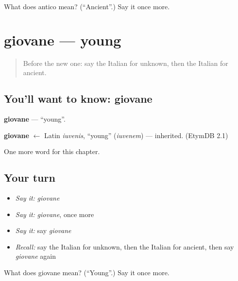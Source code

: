 \begin{tcolorbox}[breakable,colback=teal!4,colframe=teal!35!black,title={Before you move on}]
What does antico mean? (\textquotedblleft{}Ancient\textquotedblright{}.) Say it once more.
\end{tcolorbox}
\section[giovane]{giovane — young}

\label{lesson:IT-C246-giovane}



\begin{quote}
Before the new one: say the Italian for unknown, then the Italian for ancient.
\end{quote}

\subsection*{You'll want to know: giovane}
\textbf{giovane} — \textquotedblleft{}young\textquotedblright{}.

\begin{cousinweb}
\textbf{giovane} $\leftarrow$ Latin \emph{iuvenis}, \textquotedblleft{}young\textquotedblright{} (\emph{iuvenem}) — inherited. (EtymDB 2.1)
\end{cousinweb}

\begin{grammarlens}[title={What you've built}]
One more word for this chapter.
\end{grammarlens}

\subsection*{Your turn}
\begin{itemize}
\raggedright
  \item \emph{Say it:} \emph{giovane}
  \item \emph{Say it:} \emph{giovane}, once more
  \item \emph{Say it:} say \emph{giovane}
  \item \emph{Recall:} say the Italian for unknown, then the Italian for ancient, then say \emph{giovane} again
\end{itemize}

\begin{tcolorbox}[breakable,colback=teal!4,colframe=teal!35!black,title={Before you move on}]
What does giovane mean? (\textquotedblleft{}Young\textquotedblright{}.) Say it once more.
\end{tcolorbox}
